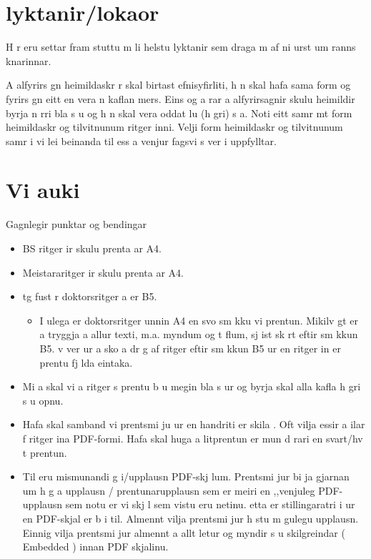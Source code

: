 \documentclass{article}
\begin{document}
\chapter{ lyktanir/lokaor }
H r eru settar fram   stuttu m li helstu  lyktanir sem draga m  af ni urst um ranns knarinnar.


%
%
\printbibliography[heading=bibintoc] %

A alfyrirs gn heimildaskr r skal birtast   efnisyfirliti, h n skal hafa sama form og fyrirs gn eitt en vera  n kaflan mers. Eins og a rar a alfyrirsagnir skulu heimildir byrja   n rri bla s u og h n skal vera oddat lu (h gri) s a.
Noti  eitt samr mt form   heimildaskr  og tilvitnunum   ritger inni. Velji  form   heimildaskr  og tilvitnunum   samr i vi  lei beinanda til  ess a  venjur fagsvi s ver i uppfylltar.


%
%

\renewcommand{\chaptername}{Vi auki}
\chapter{Vi auki}
Gagnlegir punktar og  bendingar
\begin{itemize}
 \item BS ritger ir skulu prenta ar   A4.
 \item Meistararitger ir skulu prenta ar   A4.
 \item  tg fust r  doktorsritger a er B5.
\begin{itemize}
 \item[-] I ulega er doktorsritger  unnin   A4 en svo sm kku  vi  prentun. Mikilv gt er a  tryggja a  allur texti, m.a.   myndum og t flum, sj ist sk rt eftir sm kkun   B5.  v  ver ur a  sko a dr g af ritger  eftir sm kkun   B5  ur en ritger in er prentu    fj lda eintaka.
\end{itemize}

\end{itemize}

\begin{itemize}
 \item Mi a skal vi  a  ritger  s  prentu  b u megin   bla s ur og byrja skal alla kafla   h gri s u opnu.
 \item Hafa skal samband vi  prentsmi ju  ur en handriti er skila . Oft vilja  essir a ilar f  ritger ina   PDF-formi. Hafa skal   huga a  litprentun er mun d rari en svart/hv t prentun. 
 \item Til eru mismunandi g i/upplausn   PDF-skj lum. Prentsmi jur bi ja gjarnan um h g a upplausn / prentunarupplausn sem er meiri en ,,venjuleg  PDF-upplausn sem notu  er vi  skj l sem vistu  eru   netinu.  etta er stillingaratri i  ur en PDF-skjal er b i  til. Almennt vilja prentsmi jur h stu m gulegu upplausn. Einnig vilja prentsmi jur almennt a  allt letur og myndir s u skilgreindar ( Embedded ) innan   PDF skjalinu.
\end{itemize}
\end{document}
